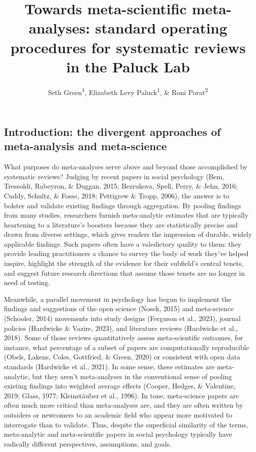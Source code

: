 \documentclass[
  man]{apa6}
\title{Towards meta-scientific meta-analyses: standard operating procedures for systematic reviews in the Paluck Lab}
\author{Seth Green\textsuperscript{1}, Elizabeth Levy Paluck\textsuperscript{1}, \& Roni Porat\textsuperscript{2}}
\date{}
\affiliation{\vspace{0.5cm}\textsuperscript{1} Princeton University\\\textsuperscript{2} Hebrew University, Jerusalem}
\begin{document}
\maketitle

\subsection{Introduction: the divergent approaches of meta-analysis and meta-science}\label{introduction-the-divergent-approaches-of-meta-analysis-and-meta-science}

What purposes do meta-analyses serve above and beyond those accomplished by systematic reviews? Judging by recent papers in social psychology (Bem, Tressoldi, Rabeyron, \& Duggan, 2015; Bezrukova, Spell, Perry, \& Jehn, 2016; Cuddy, Schultz, \& Fosse, 2018; Pettigrew \& Tropp, 2006), the answer is to bolster and validate existing findings through aggregation. By pooling findings from many studies, researchers furnish meta-analytic estimates that are typically heartening to a literature's boosters because they are statistically precise and drawn from diverse settings, which gives readers the impression of durable, widely applicable findings. Such papers often have a valedictory quality to them: they provide leading practitioners a chance to survey the body of work they've helped inspire, highlight the strength of the evidence for their subfield's central tenets, and suggest future research directions that assume those tenets are no longer in need of testing.

Meanwhile, a parallel movement in psychology has begun to implement the findings and suggestions of the open science (Nosek, 2015) and meta-science (Schooler, 2014) movements into study designs (Ferguson et al., 2023), journal policies (Hardwicke \& Vazire, 2023), and literature reviews (Hardwicke et al., 2018). Some of those reviews quantitatively assess meta-scientific outcomes, for instance, what percentage of a subset of papers are computationally reproducible (Obels, Lakens, Coles, Gottfried, \& Green, 2020) or consistent with open data standards (Hardwicke et al., 2021). In some sense, these estimates are meta-analytic, but they aren't meta-analyses in the conventional sense of pooling existing findings into weighted average effects (Cooper, Hedges, \& Valentine, 2019; Glass, 1977; Kleinstäuber et al., 1996). In tone, meta-science papers are often much more critical than meta-analyses are, and they are often written by outsiders or newcomers to an academic field who appear more motivated to interrogate than to validate. Thus, despite the superficial similarity of the terms, meta-analytic and meta-scientific papers in social psychology typically have radically different perspectives, assumptions, and goals.
\end{document}
